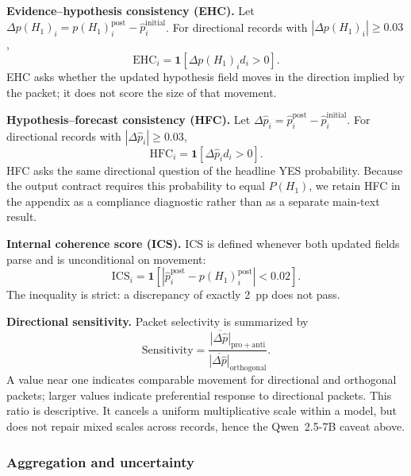 \noindent\textbf{Evidence--hypothesis consistency (EHC).}
Let \(\Delta p(H_1)_i=p(H_1)_i^{\mathrm{post}}-\hat p_i^{\mathrm{initial}}\).
For directional records with \(|\Delta p(H_1)_i|\geq0.03\),
\begin{equation}
  \mathrm{EHC}_i=\mathbf{1}\!\left[\Delta p(H_1)_i d_i>0\right].
  \label{eq:ehc}
\end{equation}
EHC asks whether the updated hypothesis field moves in the direction implied by the
packet; it does not score the size of that movement.

\noindent\textbf{Hypothesis--forecast consistency (HFC).}
Let \(\Delta\hat p_i=\hat p_i^{\mathrm{post}}-\hat p_i^{\mathrm{initial}}\).
For directional records with \(|\Delta\hat p_i|\geq0.03\),
\begin{equation}
  \mathrm{HFC}_i=\mathbf{1}\!\left[\Delta\hat p_i d_i>0\right].
  \label{eq:hfc}
\end{equation}
HFC asks the same directional question of the headline YES probability. Because
the output contract requires this probability to equal $P(H_1)$, we retain HFC in
the appendix as a compliance diagnostic rather than as a separate main-text result.

\noindent\textbf{Internal coherence score (ICS).}
ICS is defined whenever both updated fields parse and is unconditional on movement:
\begin{equation}
  \mathrm{ICS}_i=\mathbf{1}\!\left[
  \left|\hat p_i^{\mathrm{post}}-p(H_1)_i^{\mathrm{post}}\right|<0.02\right].
  \label{eq:ics}
\end{equation}
The inequality is strict: a discrepancy of exactly 2~pp does not pass.

\noindent\textbf{Directional sensitivity.}
Packet selectivity is summarized by
\begin{equation}
  \mathrm{Sensitivity}=
  \frac{\overline{|\Delta\hat p|}_{\mathrm{pro}+\mathrm{anti}}}
       {\overline{|\Delta\hat p|}_{\mathrm{orthogonal}}}.
  \label{eq:sensitivity}
\end{equation}
A value near one indicates comparable movement for directional and orthogonal
packets; larger values indicate preferential response to directional packets. This
ratio is descriptive.  It cancels a uniform multiplicative scale within a model, but
does not repair mixed scales across records, hence the Qwen~2.5-7B caveat above.

\subsubsection{Aggregation and uncertainty}
\label{app:aggregation}

